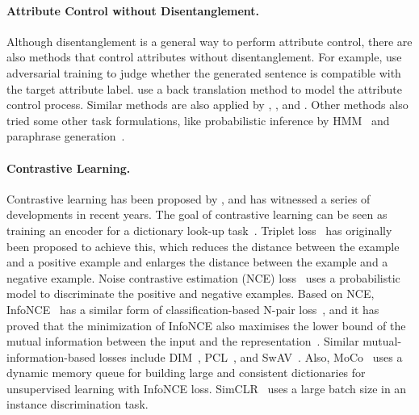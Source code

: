 \documentclass[11pt,a4paper]{article}
\renewcommand{\cite}{\citep}
\begin{document}
\paragraph{Attribute Control without Disentanglement.}
Although disentanglement is a general way to perform attribute control, there are also methods that control attributes without disentanglement. For example,  use adversarial training to  judge  whether the generated sentence is compatible with the target attribute label.   use a back translation method to model the attribute control process. Similar methods are also applied by , , and . Other methods also tried some other task formulations, like probabilistic inference by HMM~\cite{he2019probabilistic} and paraphrase generation~\cite{krishna2020reformulating}.

\paragraph{Contrastive Learning.}
Contrastive learning has been proposed by , and has witnessed a series of developments in recent years. The goal of contrastive learning can be seen as training an encoder for a dictionary look-up task~\cite{he2020momentum}. 
Triplet loss~\cite{chechik2010large,hoffer2015deep,wang2015unsupervised,sermanet2018time} has originally been proposed to achieve this, which reduces the distance between the example and a positive example and enlarges the distance between the example and a negative example. Noise contrastive estimation (NCE) loss~\cite{gutmann2010noise,gutmann2012noise} uses a probabilistic model to discriminate the positive and negative examples. Based on NCE,  InfoNCE~\cite{oord2018representation,hjelm2018learning,anand2019unsupervised,bachman2019learning,gordon2020watching,hjelm2020representation,zhuang2019local,xie2020delving,khosla2020supervised}  has a similar form of classification-based N-pair loss~\cite{le2020contrastive}, and it has proved that the minimization of InfoNCE also maximises the lower bound of the mutual information between the input and the representation~\cite{oord2018representation}. Similar mutual-information-based losses include DIM~\cite{hjelm2018learning}, PCL~\cite{li2020prototypical}, and SwAV~\cite{caron2020unsupervised}. Also, MoCo~\cite{he2020momentum,chen2020improved,chen2021empirical} uses a dynamic memory queue for building large and consistent dictionaries  for unsupervised learning with InfoNCE loss. SimCLR~\cite{chen2020simple,chen2020big} uses a large batch size in an  instance discrimination task.
\end{document}
